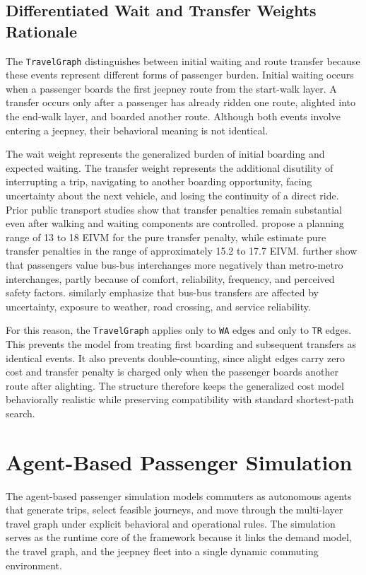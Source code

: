 {{\subsection{Differentiated Wait and Transfer Weights Rationale}
The \texttt{TravelGraph} distinguishes between initial waiting and route transfer because these events represent different forms of passenger burden. Initial waiting occurs when a passenger boards the first jeepney route from the start-walk layer. A transfer occurs only after a passenger has already ridden one route, alighted into the end-walk layer, and boarded another route. Although both events involve entering a jeepney, their behavioral meaning is not identical.

The wait weight represents the generalized burden of initial boarding and expected waiting. The transfer weight represents the additional disutility of interrupting a trip, navigating to another boarding opportunity, facing uncertainty about the next vehicle, and losing the continuity of a direct ride. Prior public transport studies show that transfer penalties remain substantial even after walking and waiting components are controlled. \cite{jara-diaz2022} propose a planning range of 13 to 18 \ac{EIVM} for the pure transfer penalty, while \cite{garciamartinez2018transfer} estimate pure transfer penalties in the range of approximately 15.2 to 17.7 \ac{EIVM}. \cite{yap2024} further show that passengers value bus-bus interchanges more negatively than metro-metro interchanges, partly because of comfort, reliability, frequency, and perceived safety factors. \cite{meskell2024} similarly emphasize that bus-bus transfers are affected by uncertainty, exposure to weather, road crossing, and service reliability.

For this reason, the \texttt{TravelGraph} applies  only to \texttt{WA} edges and  only to \texttt{TR} edges. This prevents the model from treating first boarding and subsequent transfers as identical events. It also prevents double-counting, since alight edges carry zero cost and transfer penalty is charged only when the passenger boards another route after alighting. The structure therefore keeps the generalized cost model behaviorally realistic while preserving compatibility with standard shortest-path search.

\section{Agent-Based Passenger Simulation}
\noindent
The agent-based passenger simulation models commuters as autonomous agents that generate trips, select feasible journeys, and move through the multi-layer travel graph under explicit behavioral and operational rules. The simulation serves as the runtime core of the framework because it links the demand model, the travel graph, and the jeepney fleet into a single dynamic commuting environment.

}}
